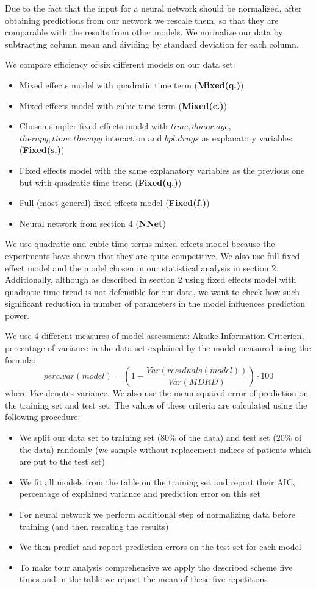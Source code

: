 \documentclass[num-refs]{wiley-article}
\begin{document}
Due to the fact that the input for a neural network should be normalized, after obtaining predictions from our network we rescale them, so that they are comparable with the results from other models. We normalize our data by subtracting column mean and dividing by standard deviation for each column. 

We compare efficiency of six different models on our data set:
\begin{itemize}
\item Mixed effects model with quadratic time term (\textbf{Mixed(q.)})
\item Mixed effects model with cubic time term (\textbf{Mixed(c.)})
\item Chosen simpler fixed effects model with $time, donor.age$, $ therapy, time:therapy$ interaction and $bpl.drugs$ as explanatory variables. (\textbf{Fixed(s.)})
\item Fixed effects model with the same explanatory variables as the previous one but with quadratic time trend (\textbf{Fixed(q.)})
\item Full (most general) fixed effects model (\textbf{Fixed(f.)})
\item Neural network from section 4 (\textbf{NNet})
\end{itemize}
We use quadratic and cubic time terms mixed effects model because the experiments have shown that they are quite competitive. We also use full fixed effect model and the model chosen in our statistical analysis in section 2. Additionally, although as described in section 2 using fixed effects model with quadratic time trend is not defensible for our data, we want to check how such significant reduction in number of parameters in the model influences prediction power.

We use 4 different measures of model assessment: Akaike Information Criterion, percentage of variance in the data set explained by the model measured using the formula:
$$
perc.var(model) = \left(1 - \frac{Var(residuals(model))}{Var(MDRD)}\right) \cdot 100
$$
where $Var$ denotes variance. We also use the mean squared error of prediction on the training set and test set. The values of these criteria are calculated using the following procedure:
\begin{itemize}
\item We split our data set to training set ($80\%$ of the data) and test set ($20\%$ of the data) randomly (we sample without replacement indices of patients which are put to the test set)
\item We fit all models from the table on the training set and report their AIC, percentage of explained variance and prediction error on this set
\item For neural network we perform additional step of normalizing data before training (and then rescaling the results) 
\item We then predict and report prediction errors on the test set for each model
\item To make tour analysis comprehensive we apply the described scheme five times and in the table we report the mean of these five repetitions
\end{itemize}
\end{document}
